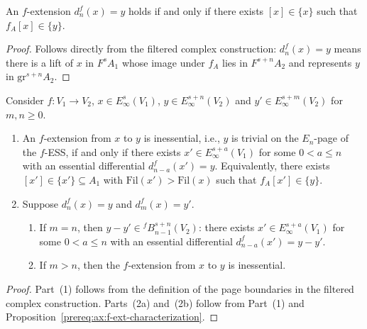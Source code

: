 \begin{axiom}\label{prereq:ax:f-ext-characterization}
    \notready
    An $f$-extension $d_n^f(x) = y$ holds if and only if there exists $[x] \in \{x\}$ such that $f_A[x] \in \{y\}$.
\end{axiom}
\begin{proof}\leanok Follows directly from the filtered complex construction: $d_n^f(x) = y$ means there is a lift of $x$ in $F^s A_1$ whose image under $f_A$ lies in $F^{s+n} A_2$ and represents $y$ in $\mathrm{gr}^{s+n} A_2$.\end{proof}

\begin{axiom}\label{prereq:ax:f-ext-inessential}
    \notready
    Consider $f: V_1 \to V_2$, $x \in E_\infty^{s}(V_1)$, $y \in E_\infty^{s+n}(V_2)$ and $y' \in E_\infty^{s+m}(V_2)$ for $m, n \ge 0$.
    \begin{enumerate}
        \item An $f$-extension from $x$ to $y$ is inessential, i.e., $y$ is trivial on the $E_n$-page of the $f$-ESS, if and only if there exists $x' \in E_\infty^{s+a}(V_1)$ for some $0 < a \le n$ with an essential differential $d_{n-a}^f(x') = y$. Equivalently, there exists $[x'] \in \{x'\} \subseteq A_1$ with $\mathrm{Fil}(x') > \mathrm{Fil}(x)$ such that $f_A[x'] \in \{y\}$.
        \item Suppose $d_n^f(x) = y$ and $d_m^f(x) = y'$.
        \begin{enumerate}
            \item If $m = n$, then $y - y' \in {}^f\!B_{n-1}^{s+n}(V_2)$: there exists $x' \in E_\infty^{s+a}(V_1)$ for some $0 < a \le n$ with an essential differential $d_{n-a}^f(x') = y - y'$.
            \item If $m > n$, then the $f$-extension from $x$ to $y$ is inessential.
        \end{enumerate}
    \end{enumerate}
\end{axiom}
\begin{proof}\leanok Part~(1) follows from the definition of the page boundaries in the filtered complex construction. Parts~(2a) and~(2b) follow from Part~(1) and Proposition~\ref{prereq:ax:f-ext-characterization}.\end{proof}

